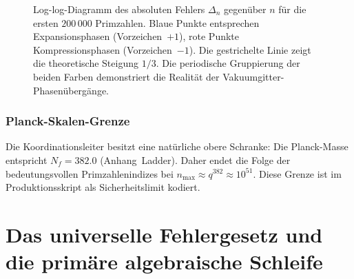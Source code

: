 \documentclass[12pt,a4paper]{article}
\theoremstyle{remark}
\begin{document}
	\begin{figure}[htbp]
		\centering
		\caption{Log-log-Diagramm des absoluten Fehlers \(\Delta_n\) gegenüber \(n\) für die ersten
			\(200\,000\) Primzahlen. Blaue Punkte entsprechen Expansionsphasen (Vorzeichen~\(+1\)),
			rote Punkte Kompressionsphasen (Vorzeichen~\(-1\)). Die gestrichelte Linie zeigt die
			theoretische Steigung \(1/3\). Die periodische Gruppierung der beiden Farben
			demonstriert die Realität der Vakuumgitter-Phasenübergänge.}
		\label{fig:loglog}
	\end{figure}
	
	\subsubsection{Planck-Skalen-Grenze}
	
	Die Koordinationsleiter besitzt eine natürliche obere Schranke: Die Planck-Masse
	entspricht \(N_f = 382.0\) (Anhang~Ladder). Daher endet die Folge der
	bedeutungsvollen Primzahlenindizes bei \(n_{\max} \approx q^{382} \approx 10^{51}\).
	Diese Grenze ist im Produktionsskript als Sicherheitslimit kodiert.
	
	\section{Das universelle Fehlergesetz und die primäre algebraische Schleife}
	\label{sec:error-law}
	
\end{document}
